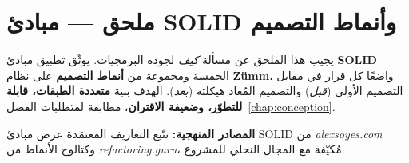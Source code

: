 
\chapter{ملحق --- مبادئ SOLID وأنماط التصميم}
\label{chap:solid}
يجيب هذا الملحق عن مسألة \emph{كيف} لجودة البرمجيات. يوثّق تطبيق مبادئ
\textbf{SOLID} الخمسة ومجموعة من \textbf{أنماط التصميم} على نظام \textbf{Zümm}،
واضعًا كل قرار في مقابل التصميم الأولي (\emph{قبل}) والتصميم المُعاد هيكلته
(\emph{بعد}). الهدف بنية \textbf{متعددة الطبقات، قابلة للتطوّر، وضعيفة الاقتران}،
مطابقة لمتطلبات الفصل~\ref{chap:conception}.

\begin{encadre}
\textbf{المصادر المنهجية:} تتّبع التعاريف المعتمَدة عرض مبادئ SOLID من
\emph{alexsoyes.com} وكتالوج الأنماط من \emph{refactoring.guru}، مُكيّفة مع
المجال النحلي للمشروع.
\end{encadre}


